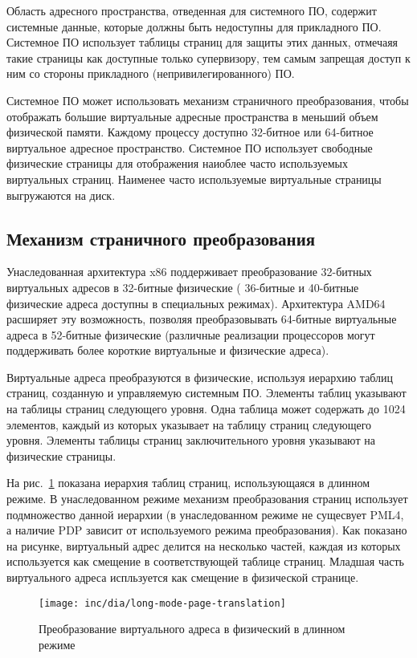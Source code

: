 Область адресного пространства, отведенная для системного ПО, содержит системные данные, которые
должны быть недоступны для прикладного ПО. Системное ПО использует таблицы страниц для защиты этих
данных, отмечаяя такие страницы как доступные только супервизору, тем самым запрещая доступ к ним со
стороны прикладного (непривилегированного) ПО.

Системное ПО может использовать механизм страничного преобразования, чтобы отображать большие
виртуальные адресные пространства в меньший объем физической памяти. Каждому процессу доступно
32-битное или 64-битное виртуальное адресное пространство. Системное ПО использует свободные
физические страницы для отображения наиоблее часто используемых виртуальных страниц. Наименее часто
используемые виртуальные страницы выгружаются на диск.

\subsection{Механизм страничного преобразования}
Унаследованная архитектура x86 поддерживает преобразование 32-битных виртуальных адресов в 32-битные физические (
36-битные и 40-битные физические адреса доступны в специальных режимах). Архитектура AMD64 расширяет эту возможность,
позволяя преобразовывать 64-битные виртуальные адреса в 52-битные физические (различные реализации процессоров
могут поддерживать более короткие виртуальные и физические адреса).

Виртуальные адреса преобразуются в физические, используя иерархию таблиц страниц, созданную и управляемую системным ПО.
Элементы таблиц указывают на таблицы страниц следующего уровня. Одна таблица может содержать до 1024 элементов,
каждый из которых указывает на таблицу страниц следующего уровня. Элементы таблицы страниц заключительного уровня
указывают на физические страницы.

На рис.~\ref{fig:long-mode-page-translation} показана иерархия таблиц страниц, использующаяся в длинном режиме.
В унаследованном режиме механизм преобразования страниц использует подмножество данной иерархии (в унаследованном
режиме не сущесвует PML4, а наличие PDP зависит от используемого режима преобразования).
Как показано на рисунке, виртуальный адрес делится на несколько частей, каждая из которых используется как смещение
в соответствующей таблице страниц. Младшая часть виртуального адреса испльзуется как смещение в физической странице.

\begin{figure}[ht!]
  \centering
  \texttt{[image: inc/dia/long-mode-page-translation]}
  \caption{Преобразование виртуального адреса в физический в длинном режиме}
  \label{fig:long-mode-page-translation}
\end{figure}

